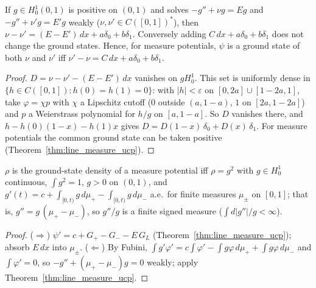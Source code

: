 \begin{theorem}
  \label{thm:line_measure_hk}
  \leanok
  If $g\in H^1_0(0,1)$ is positive on $(0,1)$ and solves $-g''+\nu g=Eg$ and $-g''+\nu'g=E'g$ weakly ($\nu,\nu'\in C([0,1])^*$), then
  $\nu-\nu'=(E-E')\,dx+a\delta_0+b\delta_1$. Conversely adding $C\,dx+a\delta_0+b\delta_1$ does not change the ground states. Hence,
  for measure potentials, $\psi$ is a ground state of both $\nu$ and $\nu'$ iff $\nu'-\nu=C\,dx+a\delta_0+b\delta_1$.
\end{theorem}
\begin{proof}
  \leanok
  $D=\nu-\nu'-(E-E')\,dx$ vanishes on $gH^1_0$. This set is uniformly dense in $\{h\in C([0,1]):h(0)=h(1)=0\}$: with $|h|<\varepsilon$ on
  $[0,2a]\cup[1-2a,1]$, take $\varphi=\chi p$ with $\chi$ a Lipschitz cutoff ($0$ outside $(a,1-a)$, $1$ on $[2a,1-2a]$) and $p$ a
  Weierstrass polynomial for $h/g$ on $[a,1-a]$. So $D$ vanishes there, and $h-h(0)(1-x)-h(1)x$ gives
  $D=D(1-x)\,\delta_0+D(x)\,\delta_1$. For measure potentials the common ground state can be taken positive
  (Theorem~\ref{thm:line_measure_ucp}).
\end{proof}

\begin{theorem}
  \label{thm:line_measure_char}
  \leanok
  $\rho$ is the ground-state density of a measure potential iff $\rho=g^2$ with $g\in H^1_0$ continuous, $\int g^2=1$, $g>0$ on
  $(0,1)$, and $g'(t)=c+\int_{[0,t)}g\,d\mu_+-\int_{[0,t)}g\,d\mu_-$ a.e.\ for finite measures $\mu_\pm$ on $[0,1]$; that is,
  $g''=g\,(\mu_+-\mu_-)$, so $g''/g$ is a finite signed measure ($\int d|g''|/g<\infty$).
\end{theorem}
\begin{proof}
  \leanok
  ($\Rightarrow$) $\psi'=c+G_+-G_--E\,G_L$ (Theorem~\ref{thm:line_measure_ucp}); absorb $E\,dx$ into $\mu_\pm$.
  ($\Leftarrow$) By Fubini, $\int g'\varphi'=c\int\varphi'-\int g\varphi\,d\mu_++\int g\varphi\,d\mu_-$ and $\int\varphi'=0$, so
  $-g''+(\mu_+-\mu_-)g=0$ weakly; apply Theorem~\ref{thm:line_measure_ucp}.
\end{proof}

